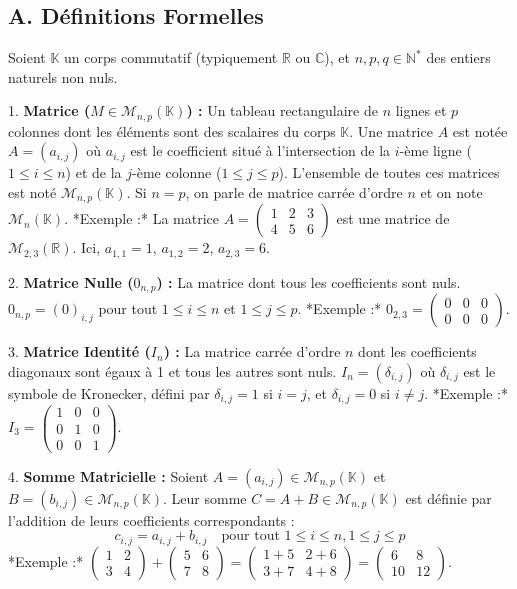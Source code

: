 \documentclass[12pt,a4paper]{report}
\begin{document}
\subsection{A. Définitions Formelles}
Soient $\mathbb{K}$ un corps commutatif (typiquement $\mathbb{R}$ ou $\mathbb{C}$), et $n, p, q \in \mathbb{N}^*$ des entiers naturels non nuls.

1.  \textbf{Matrice ($M \in \mathcal{M}_{n,p}(\mathbb{K})$) :} Un tableau rectangulaire de $n$ lignes et $p$ colonnes dont les éléments sont des scalaires du corps $\mathbb{K}$. Une matrice $A$ est notée $A = (a_{i,j})$ où $a_{i,j}$ est le coefficient situé à l'intersection de la $i$-ème ligne ($1 \le i \le n$) et de la $j$-ème colonne ($1 \le j \le p$). L'ensemble de toutes ces matrices est noté $\mathcal{M}_{n,p}(\mathbb{K})$. Si $n=p$, on parle de matrice carrée d'ordre $n$ et on note $\mathcal{M}_n(\mathbb{K})$.
    *Exemple :* La matrice $A = \begin{pmatrix} 1 & 2 & 3 \\ 4 & 5 & 6 \end{pmatrix}$ est une matrice de $\mathcal{M}_{2,3}(\mathbb{R})$. Ici, $a_{1,1}=1$, $a_{1,2}=2$, $a_{2,3}=6$.

2.  \textbf{Matrice Nulle ($0_{n,p}$) :} La matrice dont tous les coefficients sont nuls. $0_{n,p} = (0)_{i,j}$ pour tout $1 \le i \le n$ et $1 \le j \le p$.
    *Exemple :* $0_{2,3} = \begin{pmatrix} 0 & 0 & 0 \\ 0 & 0 & 0 \end{pmatrix}$.

3.  \textbf{Matrice Identité ($I_n$) :} La matrice carrée d'ordre $n$ dont les coefficients diagonaux sont égaux à 1 et tous les autres sont nuls. $I_n = (\delta_{i,j})$ où $\delta_{i,j}$ est le symbole de Kronecker, défini par $\delta_{i,j}=1$ si $i=j$, et $\delta_{i,j}=0$ si $i \neq j$.
    *Exemple :* $I_3 = \begin{pmatrix} 1 & 0 & 0 \\ 0 & 1 & 0 \\ 0 & 0 & 1 \end{pmatrix}$.

4.  \textbf{Somme Matricielle :} Soient $A = (a_{i,j}) \in \mathcal{M}_{n,p}(\mathbb{K})$ et $B = (b_{i,j}) \in \mathcal{M}_{n,p}(\mathbb{K})$. Leur somme $C = A+B \in \mathcal{M}_{n,p}(\mathbb{K})$ est définie par l'addition de leurs coefficients correspondants :
    $$c_{i,j} = a_{i,j} + b_{i,j} \quad \text{pour tout } 1 \le i \le n, 1 \le j \le p$$
    *Exemple :* $\begin{pmatrix} 1 & 2 \\ 3 & 4 \end{pmatrix} + \begin{pmatrix} 5 & 6 \\ 7 & 8 \end{pmatrix} = \begin{pmatrix} 1+5 & 2+6 \\ 3+7 & 4+8 \end{pmatrix} = \begin{pmatrix} 6 & 8 \\ 10 & 12 \end{pmatrix}$.
\end{document}
